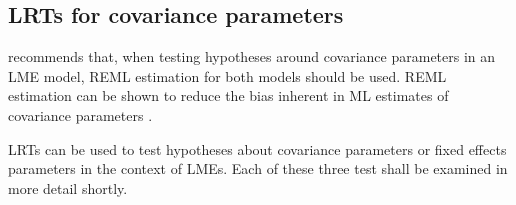 \documentclass[MAIN.tex]{subfiles}
\begin{document}
	
	
	





\subsection{LRTs for covariance parameters}
\citet{west} recommends that, when testing hypotheses around covariance parameters in an LME model, REML estimation for both models should be used. REML estimation can be shown to reduce the bias inherent in ML estimates of covariance parameters \citep{morrell98}.


LRTs can be used to test hypotheses about covariance parameters or fixed effects parameters in the context of LMEs.  Each of these three test shall be examined in more detail shortly.



\end{document}
